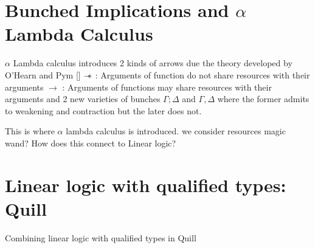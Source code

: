 \section{Bunched Implications and $\alpha$ Lambda Calculus}
$\alpha$ Lambda calculus introduces 2 kinds of arrows due the theory
developed by O'Hearn and Pym [\cite{ohearn_logic_1999}]
$\mathrel{-\mkern-6mu*}$     : Arguments of function do not share resources with their arguments
$\rightarrow$ : Arguments of functions may share resources with their arguments
and 2 new varieties of bunches $\Gamma; \Delta$ and $\Gamma, \Delta$ where
the former admits to weakening and contraction but the later does not.

This is where $\alpha$ lambda calculus is introduced. we consider resources
magic wand? How does this connect to Linear logic?


\section{Linear logic with qualified types: Quill}
Combining linear logic with qualified types in Quill \cite{morris_best_2016}

